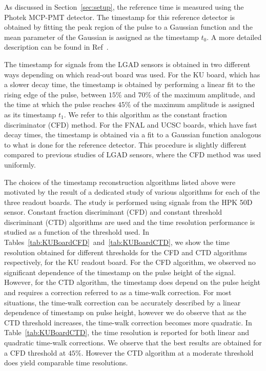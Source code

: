 \documentclass[preprint,1p]{elsarticle}
\begin{document}
As discussed in Section~\ref{sec:setup}, the reference time
is measured using the Photek MCP-PMT detector. The timestamp
for this reference detector is obtained by fitting the 
peak region of the pulse to a Gaussian function and the
mean parameter of the Gaussian is assigned as the timestamp $t_0$. 
A more detailed description can be found in Ref~\cite{Anderson:2015gha}.

The timestamp for signals from the LGAD sensors is obtained in two different ways depending on
which read-out board was used. For the KU board, which has a slower decay time,
the timestamp is obtained by performing a linear fit to the
rising edge of the pulse, between $15\%$ and $70\%$ of the maximum amplitude, 
and the time at which the pulse reaches $45\%$ of the
maximum amplitude is assigned as its timestamp $t_1$. We refer to this algorithm as the
constant fraction discriminator (CFD) method. For the FNAL and UCSC boards,
which have fast decay times, the timestamp is obtained via a fit to a 
Gaussian function analogous to what is done for the reference detector.
This procedure is slightly different compared to previous studies of LGAD sensors, 
where the CFD method was used uniformly.

The choices of the timestamp reconstruction algorithms listed above were
motivated by the result of a dedicated study of various algorithms for each of
the three readout boards. The study is performed using signals from the HPK 50D
sensor. Constant fraction discriminant (CFD) and constant threshold discriminant
(CTD) algorithms are used and the time resolution performance is studied as a
function of the threshold used. In
Tables~\ref{tab:KUBoardCFD}~and~\ref{tab:KUBoardCTD}, we show the time
resolution obtained for different thresholds for the CFD and CTD algorithms
respectively, for the KU readout board. For the CFD algorithm, we observed no
significant dependence of the timestamp on the pulse height of the signal.
However, for the CTD algorithm, the timestamp does depend on the pulse height
and requires a correction referred to as a time-walk correction. For most
situations, the time-walk correction can be accurately described by a linear
dependence of timestamp on pulse height, however we do observe that as the CTD threshold increases, the
time-walk correction becomes more quadratic. In Table~\ref{tab:KUBoardCTD}, the
time resolution is reported for both linear and quadratic time-walk corrections.
We observe that the best results are obtained for a CFD threshold at $45\%$.
However the CTD algorithm at a moderate threshold does yield comparable time
resolutions. 
\end{document}
